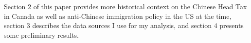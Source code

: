 






Section 2 of this paper provides more historical context on the Chinese Head Tax in Canada as well as anti-Chinese immigration policy in the US at the time, section 3 describes the data sources I use for my analysis, and section 4 presents some preliminary results.
